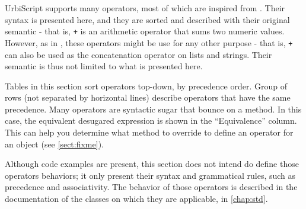 \documentclass[openright,twoside,12pt]{report}
\newcommand{\us}{UrbiScript\xspace}
\newcommand{\sect}[1]{\autoref{sect:#1}}
\begin{document}
\us supports many operators, most of which are inspired from
\Cxx. Their syntax is presented here, and they are sorted and
described with their original semantic - that is, \lstinline|+| is an
arithmetic operator that sums two numeric values. However, as in \Cxx,
these operators might be use for any other purpose - that is,
\lstinline|+| can also be used as the concatenation operator on lists
and strings. Their semantic is thus not limited to what is presented
here.

Tables in this section sort operators top-down, by precedence order.
Group of rows (not separated by horizontal lines) describe operators
that have the same precedence. Many operators are syntactic sugar that
bounce on a method. In this case, the equivalent desugared expression
is shown in the ``Equivalence'' column. This can help you determine
what method to override to define an operator for an object (see
\sect{fixme}).

Although code examples are present, this section does not intend do
define those operators behaviors; it only present their syntax and
grammatical rules, such as precedence and associativity. The behavior
of those operators is described in the documentation of the classes on
which they are applicable, in \autoref{chap:std}.

\newcommand{\operatorhead}{Operator & Use & Associativity & Original semantic
  & Equivalence\\}


\newcommand{\operator}[6][ ]{\lstinline@#2@&\lstinline@#3@&#4&#5&\lstinline@#6@#1\\}
\newcommand{\boperator}[3]{\operator{#1}{a #1 b}{#2}{#3}{a.'#1'(b)}}
\newcommand{\poperator}[3]{\operator{#1}{#1a}{#2}{#3}{a.'#1'()}}

\newcommand{\operatordot}    {\operator  {.}    {a.b}              {-}     {Message sending}          {Not redefinable}       }
\newcommand{\operatordota}   {\operator  {.}    {a.b(args)}        {-}     {Message sending}          {Not redefinable}       }
\newcommand{\operatorsub}    {\operator  {[]}   {a[args]}          {-}     {Subscript}                {a.'[]'(args)}          }
\newcommand{\operatorsubass} {\operator  {[] =} {a[args] = v}      {-}     {Subscript assignment}     {a.'[]='(args, v)}      }
\newcommand{\operatorass}[2][ ]    {\operator[#1]
                                         {=}    {a = b}            {Right} {Assignment}               {updateSlot("a", b)}    }

\newcommand{\operatoriass}[1]{\operator  {#1=}  {a #1= b}          {Right} {In place assignment}      {a = a #1 b}            }
\newcommand{\operatorsiass}  {
    \operatoriass{+}
    \operatoriass{-}
    \operatoriass{*}
    \operatoriass{/}
    \operatoriass{\%}
    \operatoriass{\^}
    \operatoriass{\~}
}
\newcommand{\operatorinc}    {\operator  {++}   {a++}              {-}     {Incrementation}           {(a = a + 1) - 1}       }
\newcommand{\operatordec}    {\operator  {--}   {a--}              {-}     {Incrementation}           {(a = a - 1) + 1}       }
\end{document}
